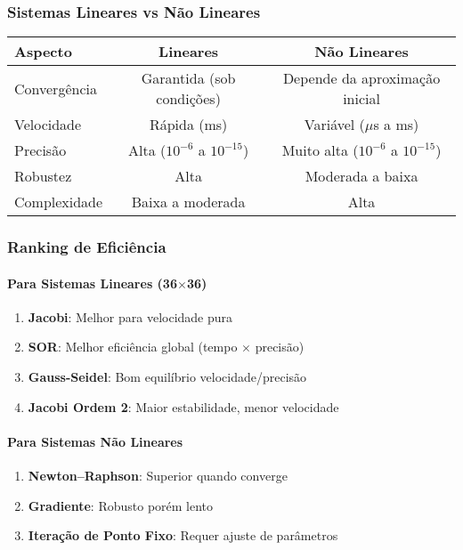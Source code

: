 \documentclass[12pt,a4paper]{article}
\begin{document}
\subsubsection{Sistemas Lineares vs Não Lineares}
\begin{table}[H]
\centering
\begin{tabular}{lcc}
\hline
\textbf{Aspecto} & \textbf{Lineares} & \textbf{Não Lineares} \\
\hline
Convergência & Garantida (sob condições) & Depende da aproximação inicial \\
Velocidade & Rápida (ms) & Variável ($\mu$s a ms) \\
Precisão & Alta ($10^{-6}$ a $10^{-15}$) & Muito alta ($10^{-6}$ a $10^{-15}$) \\
Robustez & Alta & Moderada a baixa \\
Complexidade & Baixa a moderada & Alta \\
\hline
\end{tabular}
\end{table}

\subsubsection{Ranking de Eficiência}
\paragraph{Para Sistemas Lineares (36$\times$36)}
\begin{enumerate}
    \item \textbf{Jacobi}: Melhor para velocidade pura
    \item \textbf{SOR}: Melhor eficiência global (tempo $\times$ precisão)
    \item \textbf{Gauss-Seidel}: Bom equilíbrio velocidade/precisão
    \item \textbf{Jacobi Ordem 2}: Maior estabilidade, menor velocidade
\end{enumerate}

\paragraph{Para Sistemas Não Lineares}
\begin{enumerate}
    \item \textbf{Newton--Raphson}: Superior quando converge
    \item \textbf{Gradiente}: Robusto porém lento
    \item \textbf{Iteração de Ponto Fixo}: Requer ajuste de parâmetros
\end{enumerate}
\end{document}
